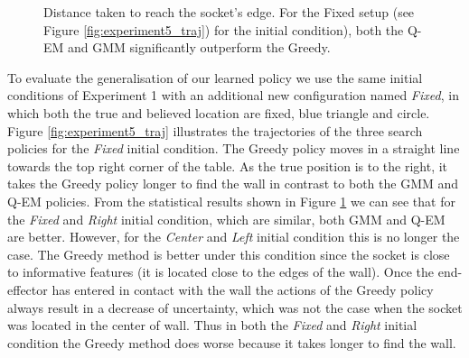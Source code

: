 \begin{figure}
 \centering
    \caption{Distance taken to reach the socket's edge. For the Fixed setup (see Figure \ref{fig:experiment5_traj}) for 
    the initial condition), both the Q-EM and GMM significantly outperform the Greedy. }
    \label{fig:experiment5_stats}
\end{figure}

To evaluate the generalisation of our learned policy we use the same initial conditions of Experiment 1 with an additional 
new configuration named \textit{Fixed}, in which both the true and believed location are fixed, blue triangle and circle.
Figure \ref{fig:experiment5_traj} illustrates the trajectories of the three search policies for the \textit{Fixed} initial condition. 
The Greedy policy moves in a straight line towards the top
right corner of the table. As the true position is to the right, it takes the Greedy policy longer to find the wall 
in contrast to both the GMM and Q-EM policies. From the statistical results shown in Figure \ref{fig:experiment5_stats} we can see
that for the \textit{Fixed} and \textit{Right} initial condition, which are similar, both GMM and Q-EM are better. However, for 
the \textit{Center} and \textit{Left} initial condition this is no longer the case. 
The Greedy method is better under this condition since the socket is close to informative features (it is located close to the edges of the wall). 
Once the end-effector has entered in contact with the wall the actions of the Greedy policy always result in a decrease of uncertainty, which was not the case when the socket was located in the center of wall. 
Thus in both the \textit{Fixed} and \textit{Right} initial condition the Greedy method does worse because it takes longer
to find the wall.

